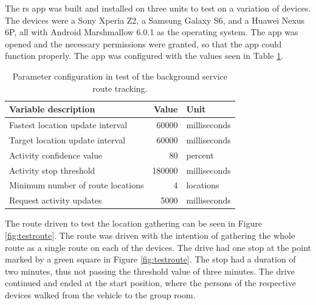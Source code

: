 The \gls{rs} app was built and installed on three units to test on a variation of devices.
The devices were a Sony Xperia Z2, a Samsung Galaxy S6, and a Huawei Nexus 6P, all with Android Marshmallow 6.0.1 as the operating system.
The app was opened and the necessary permissions were granted, so that the app could function properly.
The app was configured with the values seen in Table \ref{tab:appconfig}.

\begin{table}[!ht]
	\centering
	\begin{tabular}{l r l}
		Variable description & Value & Unit\\
		\hline
		Fastest location update interval & 60000 & milliseconds\\
		Target location update interval & 60000 & milliseconds\\ 
		Activity confidence value & 80 & percent\\
		Activity stop threshold & 180000 & milliseconds\\
		Minimum number of route locations & 4 & locations \\
		Request activity updates & 5000 & milliseconds\\ 
	\end{tabular}
	\caption{Parameter configuration in test of the background service route tracking.}
	\label{tab:appconfig}
\end{table}

The route driven to test the location gathering can be seen in Figure \ref{fig:testroute}.
The route was driven with the intention of gathering the whole route as a single route on each of the devices.
The drive had one stop at the point marked by a green square in Figure \ref{fig:testroute}.
The stop had a duration of two minutes, thus not passing the threshold value of three minutes.
The drive continued and ended at the start position, where the persons of the respective devices walked from the vehicle to the group room.

